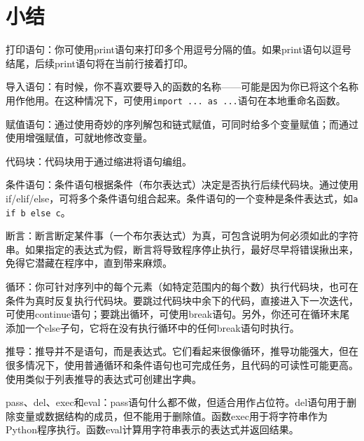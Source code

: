 \section{小结}
\begin{dinglist}{43}
    \item 打印语句：你可使用print语句来打印多个用逗号分隔的值。如果print语句以逗号结尾，后续print语句将在当前行接着打印。
    \item 导入语句：有时候，你不喜欢要导入的函数的名称——可能是因为你已将这个名称用作他用。在这种情况下，可使用\verb|import ... as ...|语句在本地重命名函数。
    \item 赋值语句：通过使用奇妙的序列解包和链式赋值，可同时给多个变量赋值；而通过使用增强赋值，可就地修改变量。
    \item 代码块：代码块用于通过缩进将语句编组。
    \item 条件语句：条件语句根据条件（布尔表达式）决定是否执行后续代码块。通过使用if/elif/else，可将多个条件语句组合起来。条件语句的一个变种是条件表达式，如\verb|a if b else c|。
    \item 断言：断言断定某件事（一个布尔表达式）为真，可包含说明为何必须如此的字符串。如果指定的表达式为假，断言将导致程序停止执行，最好尽早将错误揪出来，免得它潜藏在程序中，直到带来麻烦。
    \item 循环：你可针对序列中的每个元素（如特定范围内的每个数）执行代码块，也可在条件为真时反复执行代码块。要跳过代码块中余下的代码，直接进入下一次迭代，可使用continue语句；要跳出循环，可使用break语句。另外，你还可在循环末尾添加一个else子句，它将在没有执行循环中的任何break语句时执行。
    \item 推导：推导并不是语句，而是表达式。它们看起来很像循环，推导功能强大，但在很多情况下，使用普通循环和条件语句也可完成任务，且代码的可读性可能更高。使用类似于列表推导的表达式可创建出字典。
    \item pass、del、exec和eval：pass语句什么都不做，但适合用作占位符。del语句用于删除变量或数据结构的成员，但不能用于删除值。函数exec用于将字符串作为Python程序执行。函数eval计算用字符串表示的表达式并返回结果。
\end{dinglist}